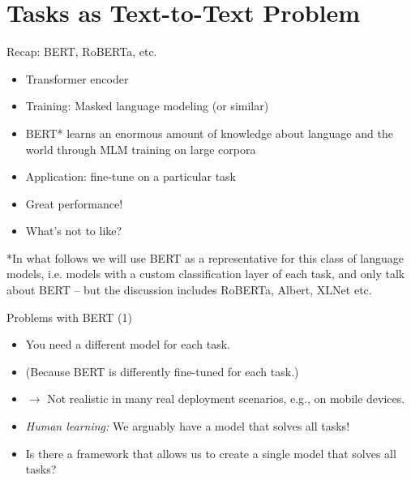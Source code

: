 

\section{Tasks as Text-to-Text Problem}

\begin{frame}{Recap: BERT, RoBERTa, etc.}

\vfill

  \begin{itemize}
\item Transformer encoder
\item Training: Masked language modeling (or similar)
\item BERT* learns an enormous amount of knowledge
about language and the world through MLM training on large corpora
\item Application: fine-tune on a particular task
\item Great performance!
\item \ques What's not to like?
    \end{itemize}

\vfill

*\scriptsize{In what follows we will use BERT as a representative for this class of language models, i.e. models with a custom classification layer of each task, and only talk about BERT -- but the discussion includes RoBERTa, Albert, XLNet etc.}

\end{frame}


\begin{frame}{Problems with BERT (1)}

\vfill

  \begin{itemize}
\item You need a different model for each task.
\item[] (Because BERT is differently fine-tuned for each task.)
\item[] $\to$ Not realistic in many real deployment scenarios, e.g., on mobile devices.
\item \textit{Human learning:} We arguably have a  model that solves all tasks!
\item \ques Is there a framework that allows us to create a single model that solves all tasks?
    \end{itemize}

\vfill

\end{frame}

